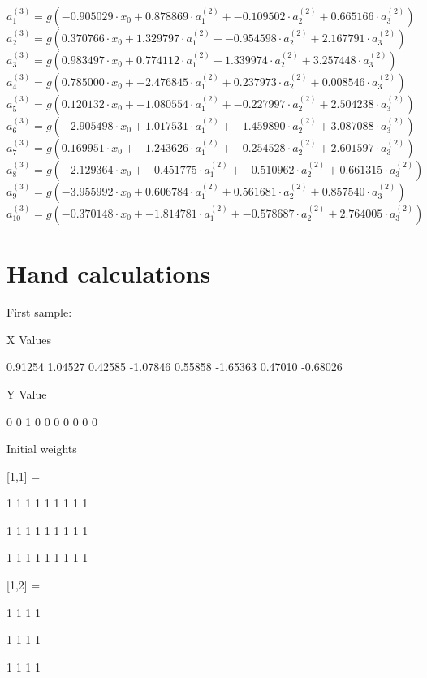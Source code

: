 \documentclass[10pt]{article}
\begin{document}
\begin{flushleft}
\scriptsize
$a_{1}^{(3)} = g(-0.905029 \cdot x_{0}+0.878869 \cdot a_{1}^{(2)}+-0.109502 \cdot a_{2}^{(2)}+0.665166 \cdot a_{3}^{(2)})$
$a_{2}^{(3)} = g(0.370766 \cdot x_{0}+1.329797 \cdot a_{1}^{(2)}+-0.954598 \cdot a_{2}^{(2)}+2.167791 \cdot a_{3}^{(2)})$
$a_{3}^{(3)} = g(0.983497 \cdot x_{0}+0.774112 \cdot a_{1}^{(2)}+1.339974 \cdot a_{2}^{(2)}+3.257448 \cdot a_{3}^{(2)})$
$a_{4}^{(3)} = g(0.785000 \cdot x_{0}+-2.476845 \cdot a_{1}^{(2)}+0.237973 \cdot a_{2}^{(2)}+0.008546 \cdot a_{3}^{(2)})$
$a_{5}^{(3)} = g(0.120132 \cdot x_{0}+-1.080554 \cdot a_{1}^{(2)}+-0.227997 \cdot a_{2}^{(2)}+2.504238 \cdot a_{3}^{(2)})$
$a_{6}^{(3)} = g(-2.905498 \cdot x_{0}+1.017531 \cdot a_{1}^{(2)}+-1.459890 \cdot a_{2}^{(2)}+3.087088 \cdot a_{3}^{(2)})$
$a_{7}^{(3)} = g(0.169951 \cdot x_{0}+-1.243626 \cdot a_{1}^{(2)}+-0.254528 \cdot a_{2}^{(2)}+2.601597 \cdot a_{3}^{(2)})$
$a_{8}^{(3)} = g(-2.129364 \cdot x_{0}+-0.451775 \cdot a_{1}^{(2)}+-0.510962 \cdot a_{2}^{(2)}+0.661315 \cdot a_{3}^{(2)})$
$a_{9}^{(3)} = g(-3.955992 \cdot x_{0}+0.606784 \cdot a_{1}^{(2)}+0.561681 \cdot a_{2}^{(2)}+0.857540 \cdot a_{3}^{(2)})$
$a_{10}^{(3)} = g(-0.370148 \cdot x_{0}+-1.814781 \cdot a_{1}^{(2)}+-0.578687 \cdot a_{2}^{(2)}+2.764005 \cdot a_{3}^{(2)})$


\normalsize
\newpage

\section{Hand calculations}

\small

First sample: 

X Values

   0.91254   1.04527   0.42585  -1.07846   0.55858  -1.65363   0.47010  -0.68026

Y Value

   0   0   1   0   0   0   0   0   0   0

Initial weights

{

  [1,1] =

     1   1   1   1   1   1   1   1   1

     1   1   1   1   1   1   1   1   1

     1   1   1   1   1   1   1   1   1

  [1,2] =

     1   1   1   1

     1   1   1   1

     1   1   1   1

}
\end{flushleft}
\end{document}
